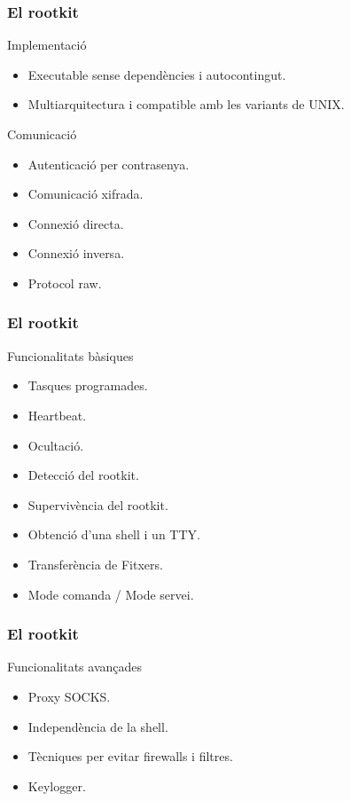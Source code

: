 \documentclass{beamer}
\begin{document}
\begin{frame}
	\frametitle{El rootkit}
	\begin{block}{Implementació}
		\begin{itemize}
			\item Executable sense dependències i autocontingut.
				\pause
			\item Multiarquitectura i compatible amb les variants de UNIX.
				\pause
		\end{itemize}
	\end{block}
	\begin{block}{Comunicació}
		\begin{itemize}
			\item Autenticació per contrasenya.
				\pause
			\item Comunicació xifrada.
				\pause
			\item Connexió directa.
				\pause
			\item Connexió inversa.
				\pause
			\item Protocol raw.
		\end{itemize}
	\end{block}
\end{frame}
\begin{frame}
	\frametitle{El rootkit}
	\begin{block}{Funcionalitats bàsiques}
		\begin{itemize}
			\item Tasques programades.
				\pause
			\item Heartbeat.
				\pause
			\item Ocultació.
				\pause
			\item Detecció del rootkit.
				\pause
			\item Supervivència del rootkit.
				\pause
			\item Obtenció d'una shell i un TTY.
				\pause
			\item Transferència de Fitxers.
				\pause
			\item Mode comanda / Mode servei.
		\end{itemize}
	\end{block}
\end{frame}
\begin{frame}
	\frametitle{El rootkit}
	\begin{block}{Funcionalitats avançades}
		\begin{itemize}
			\item Proxy SOCKS.
				\pause
			\item Independència de la shell.
				\pause
			\item Tècniques per evitar firewalls i filtres.
				\pause
			\item Keylogger.
		\end{itemize}
	\end{block}
\end{frame}
\end{document}

